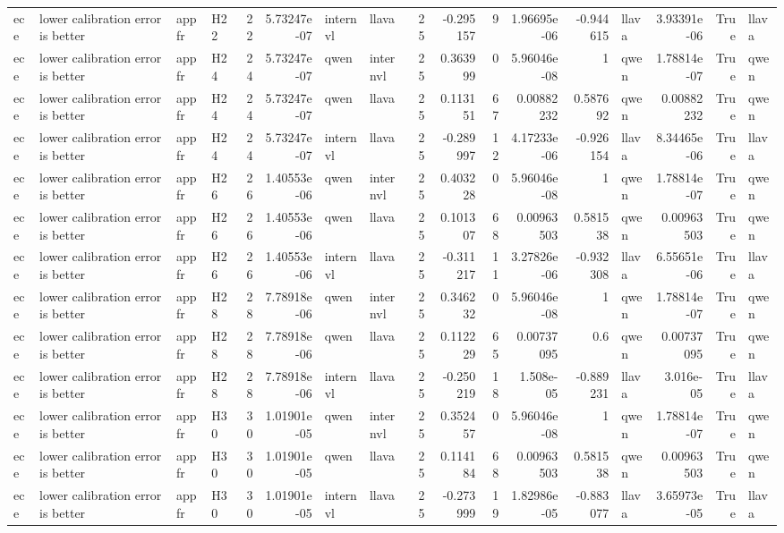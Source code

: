 \begin{longtable}{llllrrllrrrrrlrrl}
ece & lower calibration error is better & appfr & H22 & 22 & 5.73247e-07 & internvl & llava & 25 & -0.295157 & 9 & 1.96695e-06 & -0.944615 & llava & 3.93391e-06 & True & llava \\
ece & lower calibration error is better & appfr & H24 & 24 & 5.73247e-07 & qwen & internvl & 25 & 0.363999 & 0 & 5.96046e-08 & 1 & qwen & 1.78814e-07 & True & qwen \\
ece & lower calibration error is better & appfr & H24 & 24 & 5.73247e-07 & qwen & llava & 25 & 0.113151 & 67 & 0.00882232 & 0.587692 & qwen & 0.00882232 & True & qwen \\
ece & lower calibration error is better & appfr & H24 & 24 & 5.73247e-07 & internvl & llava & 25 & -0.289997 & 12 & 4.17233e-06 & -0.926154 & llava & 8.34465e-06 & True & llava \\
ece & lower calibration error is better & appfr & H26 & 26 & 1.40553e-06 & qwen & internvl & 25 & 0.403228 & 0 & 5.96046e-08 & 1 & qwen & 1.78814e-07 & True & qwen \\
ece & lower calibration error is better & appfr & H26 & 26 & 1.40553e-06 & qwen & llava & 25 & 0.101307 & 68 & 0.00963503 & 0.581538 & qwen & 0.00963503 & True & qwen \\
ece & lower calibration error is better & appfr & H26 & 26 & 1.40553e-06 & internvl & llava & 25 & -0.311217 & 11 & 3.27826e-06 & -0.932308 & llava & 6.55651e-06 & True & llava \\
ece & lower calibration error is better & appfr & H28 & 28 & 7.78918e-06 & qwen & internvl & 25 & 0.346232 & 0 & 5.96046e-08 & 1 & qwen & 1.78814e-07 & True & qwen \\
ece & lower calibration error is better & appfr & H28 & 28 & 7.78918e-06 & qwen & llava & 25 & 0.112229 & 65 & 0.00737095 & 0.6 & qwen & 0.00737095 & True & qwen \\
ece & lower calibration error is better & appfr & H28 & 28 & 7.78918e-06 & internvl & llava & 25 & -0.250219 & 18 & 1.508e-05 & -0.889231 & llava & 3.016e-05 & True & llava \\
ece & lower calibration error is better & appfr & H30 & 30 & 1.01901e-05 & qwen & internvl & 25 & 0.352457 & 0 & 5.96046e-08 & 1 & qwen & 1.78814e-07 & True & qwen \\
ece & lower calibration error is better & appfr & H30 & 30 & 1.01901e-05 & qwen & llava & 25 & 0.114184 & 68 & 0.00963503 & 0.581538 & qwen & 0.00963503 & True & qwen \\
ece & lower calibration error is better & appfr & H30 & 30 & 1.01901e-05 & internvl & llava & 25 & -0.273999 & 19 & 1.82986e-05 & -0.883077 & llava & 3.65973e-05 & True & llava \\

\end{longtable}
